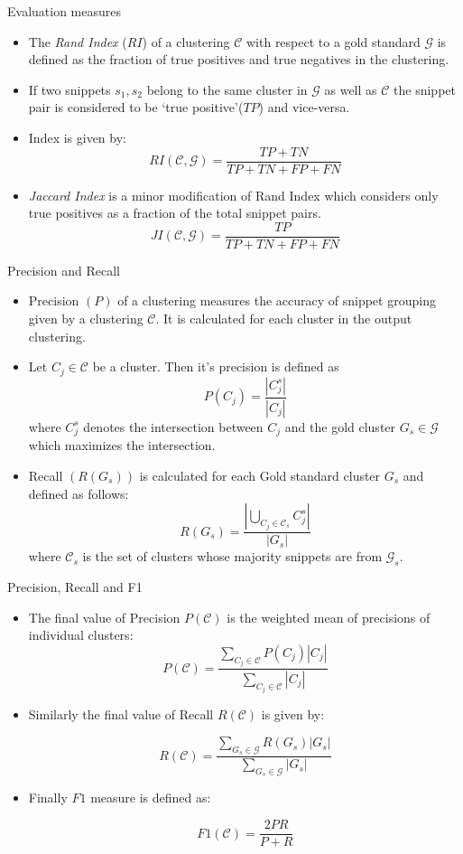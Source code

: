 \documentclass{beamer}
\begin{document}
\begin{frame}{Evaluation measures}
\begin{itemize}
\item The {\it Rand Index} ($RI$) of a clustering $\mathcal{C}$ with
  respect to a gold standard $\mathcal{G}$ is defined as the fraction
  of true positives and true negatives in the clustering.
\item If two snippets $s_1, s_2$ belong to the same cluster in
  $\mathcal{G}$ as well as $\mathcal{C}$ the snippet pair is
  considered to be `true positive'($TP$) and vice-versa. 
\item   Index is given by:
$$
RI(\mathcal{C},\mathcal{G}) = \frac{TP + TN}{TP + TN + FP + FN}
$$
 \item {\it Jaccard Index} is a minor modification of Rand Index which
considers only true positives as a fraction of the total snippet
pairs. 
$$
JI(\mathcal{C},\mathcal{G}) = \frac{TP}{TP + TN + FP + FN}
$$
\end{itemize}
\end{frame}

\begin{frame}{Precision and Recall}
\begin{itemize}
\item Precision $(P)$ of a clustering measures the accuracy of snippet
grouping given by a clustering $\mathcal{C}$. It is calculated for
each cluster in the output clustering. 
\item Let $C_j \in \mathcal{C}$ be a cluster. Then it's precision is
  defined as
$$
P(C_j) = \frac{|C_j^s|}{|C_j|}
$$ 
where $C_j^s$ denotes the intersection between $C_j$ and the gold
cluster $G_s \in \mathcal{G}$ which maximizes the intersection.
\item Recall $(R(G_s))$ is calculated for each Gold standard cluster $G_s$ and
defined as follows: 
$$
R(G_s) = \frac{|\bigcup_{C_j \in \mathcal{C}_s}C_j^s|}{|G_s|}
$$ where ${\mathcal{C}_s}$ is the set of clusters whose majority
snippets are from ${\mathcal{G}_s}$.
\end{itemize}
\end{frame}

\begin{frame}{Precision, Recall and F1}
\begin{itemize}
\item The final value of Precision $P(\mathcal{C})$ is the
weighted mean of precisions of individual clusters:
$$
P(\mathcal{C}) = \frac{\sum_{C_j \in \mathcal{C}}P(C_j)|C_j|}{\sum_{C_j \in \mathcal{C}}|C_j|}
$$
\item 
Similarly the final value of Recall $R(\mathcal{C})$ is given by:

$$
R(\mathcal{C}) = \frac{\sum_{G_s \in \mathcal{G}}R(G_s)|G_s|}{\sum_{G_s \in \mathcal{G}}|G_s|}
$$
\item Finally $F1$ measure is defined as:

$$
F1(\mathcal{C}) = \frac{2PR}{P+R}
$$
\end{itemize}
\end{frame}
\end{document}

